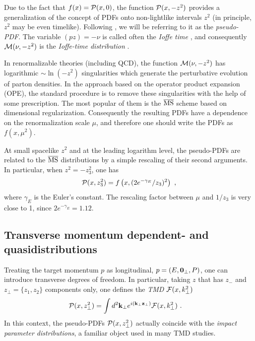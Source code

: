 Due to the fact that $f(x) =   {\cal P} (x, 0) $, the function $ {\cal P} (x, -z^2) $ provides a generalization of the concept of
PDFs onto non-lightlike intervals $z^2$ (in principle, $z^2$ may be even timelike).
 Following   \cite{Radyushkin:2017cyf} ,  we will be referring to it as the
 {\it pseudo-PDF}.  The variable $(pz)=-\nu $ is  called  often  the {\it Ioffe time} \cite{Ioffe:1969kf},
and  consequently ${\cal M}(\nu , -z^2) $  is  the {\it Ioffe-time distribution} \cite{Braun:1994jq}.


 In renormalizable theories (including QCD),
  the function  $ {\cal M} (\nu, -z^2)  $
 has  logarithmic $\sim \ln (-z^2)$  singularities
which generate the perturbative evolution of parton densities.
In the approach based on  the operator product expansion
(OPE),  the standard procedure is to  remove  these singularities  with the help of some
 prescription.
The most popular of them is the  $\overline{\rm MS}$  scheme based
on dimensional  regularization.
Consequently the resulting PDFs  have a dependence on the renormalization scale
$\mu$, and therefore one should write the PDFs as $   f(x, \mu^2)$.

At small spacelike $z^2$ and at the leading logarithm level, the pseudo-PDFs are
related to the $\overline{\rm MS}$ distributions by a simple rescaling of their second arguments.
In particular, when $z^2=-z_3^2$, one has
\begin{align}
    {\cal P} (x, z_3^2) = f \left (x, (2 e^{-\gamma_E}/ z_3)^2 \right )
  \  ,
\label{Ptof}
\end{align}
where $\gamma_E$  is the Euler's constant.
The rescaling  factor  between $\mu$ and $1/z_3$ is very close to 1, since \mbox{$2e^{-\gamma_E}=1.12$. }


\subsection{Transverse momentum dependent-  and quasidistributions}


Treating the target momentum $p$ as   longitudinal,
\mbox{$p= (E, {\bf 0}_\perp, P)$,}  one can introduce
transverse degrees of freedom.
In particular, taking $z$ that has
 $z_-$ and \mbox{$z_\perp= \{z_1,z_2\}$}  components only,  one defines  the
{\it TMD }   ${\cal F} (x, k_\perp^2)$   %
      \begin{align}
 {\cal P} (x,  z_\perp^2)
&   =
    \int  d^2{\bf k}_\perp   e^{i ({\bf k}_\perp {\bf z}_\perp)}
      {\cal F} (x, {k}_\perp^2)
 \   .
  \label{MTMD0}
\end{align}
In  this context, the pseudo-PDFs  $ {\cal P} (x,  z_\perp^2) $ actually coincide
with the  {\it impact parameter distributions},   a familiar object
used in many TMD studies.



